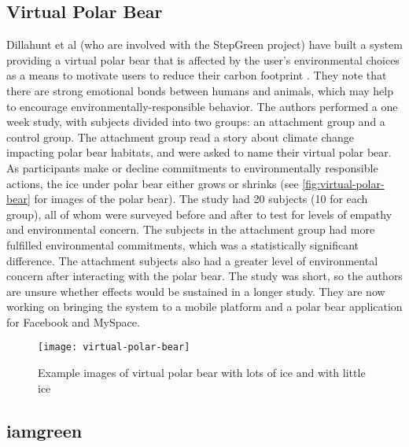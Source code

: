 \subsection{Virtual Polar Bear}
\label{virtual-polar-bear}

Dillahunt et al (who are involved with the StepGreen project) have built a system providing a virtual polar bear that is affected by the user's environmental choices as a means to motivate users to reduce their carbon footprint \cite{dillahunt-virtual-polar-bear-2008}. They note that there are strong emotional bonds between humans and animals, which may help to encourage environmentally-responsible behavior. The authors performed a one week study, with subjects divided into two groups: an attachment group and a control group. The attachment group read a story about climate change impacting polar bear habitats, and were asked to name their virtual polar bear. As participants make or decline commitments to environmentally responsible actions, the ice under polar bear either grows or shrinks (see \autoref{fig:virtual-polar-bear} for images of the polar bear). The study had 20 subjects (10 for each group), all of whom were surveyed before and after to test for levels of empathy and environmental concern. The subjects in the attachment group had more fulfilled environmental commitments, which was a statistically significant difference. The attachment subjects also had a greater level of environmental concern after interacting with the polar bear. The study was short, so the authors are unsure whether effects would be sustained in a longer study. They are now working on bringing the system to a mobile platform and a polar bear application for Facebook and MySpace.

\begin{figure}[htbp]
	\begin{center}
		\texttt{[image: virtual-polar-bear]}
		\caption{Example images of virtual polar bear with lots of ice and with little ice}
		\label{fig:virtual-polar-bear}
 	\end{center}
\end{figure}

\subsection{iamgreen}
\label{iamgreen}

